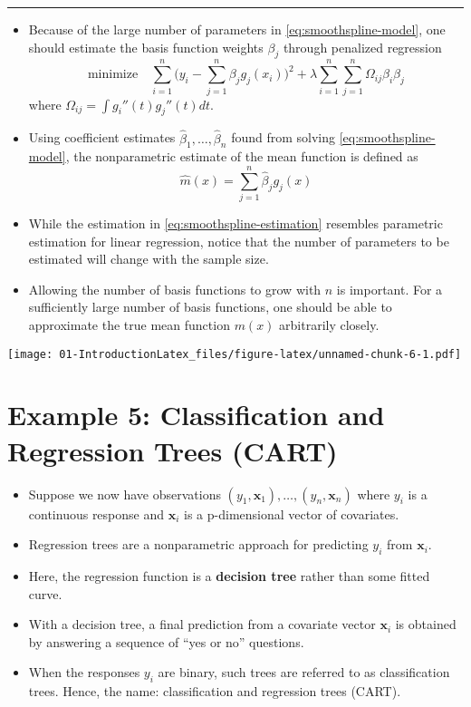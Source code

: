 \documentclass[]{book}
\begin{document}
\begin{center}\rule{0.5\linewidth}{\linethickness}\end{center}

\begin{itemize}
\item
  Because of the large number of parameters in \eqref{eq:smoothspline-model}, one should
  estimate the basis function weights \(\beta_{j}\) through penalized regression
  \begin{equation}
  \textrm{minimize} \quad \sum_{i=1}^{n} \Big( y_{i} - \sum_{j=1}^{n} \beta_{j}g_{j}( x_{i} ) \Big)^{2} + \lambda \sum_{i=1}^{n}\sum_{j=1}^{n} \Omega_{ij}\beta_{i}\beta_{j}
  \label{eq:smoothspline-estimation}
  \end{equation}
  where \(\Omega_{ij} = \int g_{i}''(t)g_{j}''(t) dt\).
\item
  Using coefficient estimates \(\hat{\beta}_{1}, \ldots, \hat{\beta}_{n}\) found from solving \eqref{eq:smoothspline-model}, the nonparametric estimate of the mean function is defined as
  \begin{equation}
  \hat{m}(x) = \sum_{j=1}^{n} \hat{\beta}_{j}g_{j}(x) 
  \end{equation}
\item
  While the estimation in \eqref{eq:smoothspline-estimation} resembles parametric estimation for linear regression, notice
  that the number of parameters to be estimated will change with the sample size.
\item
  Allowing the number of basis functions to grow with \(n\) is important. For a sufficiently large number of basis functions, one should be able to approximate the
  true mean function \(m(x)\) arbitrarily closely.
\end{itemize}

\texttt{[image: 01-IntroductionLatex\_files/figure-latex/unnamed-chunk-6-1.pdf]}

\hypertarget{sec:example-nonpar-regress2}{%
\section{Example 5: Classification and Regression Trees (CART)}\label{sec:example-nonpar-regress2}}

\begin{itemize}
\item
  Suppose we now have observations \((y_{1}, \mathbf{x}_{1}), \ldots, (y_{n}, \mathbf{x}_{n})\) where
  \(y_{i}\) is a continuous response and \(\mathbf{x}_{i}\) is a p-dimensional vector of covariates.
\item
  Regression trees are a nonparametric approach for predicting \(y_{i}\) from \(\mathbf{x}_{i}\).
\item
  Here, the regression function is a \textbf{decision tree} rather than some fitted curve.
\item
  With a decision tree, a final prediction from a covariate vector \(\mathbf{x}_{i}\) is obtained by answering
  a sequence of ``yes or no'' questions.
\item
  When the responses \(y_{i}\) are binary, such trees are referred to as classification trees.
  Hence, the name: classification and regression trees (CART).
\end{itemize}
\end{document}
